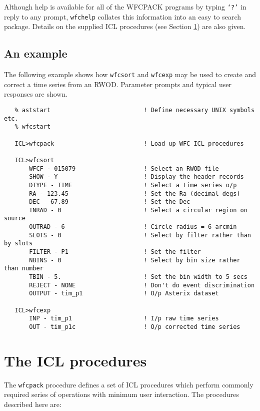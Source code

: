 Although help is available for all of the WFCPACK programs by typing
{\tt `?'} in reply to any prompt, {\tt wfchelp} collates this information
into an easy to search package. Details on the supplied ICL procedures
(see Section \ref{sec:procedures}) are also given.

\subsection{An example}
\label{sec:programs:example}

The following example shows how {\tt wfcsort} and {\tt wfcexp} may be
used to create and correct a time series from an RWOD. Parameter
prompts and typical user responses are shown.

\begin{verbatim}
   % aststart                          ! Define necessary UNIX symbols etc.
   % wfcstart

   ICL>wfcpack                         ! Load up WFC ICL procedures

   ICL>wfcsort
       WFCF - 015079                   ! Select an RWOD file
       SHOW - Y                        ! Display the header records
       DTYPE - TIME                    ! Select a time series o/p
       RA - 123.45                     ! Set the Ra (decimal degs)
       DEC - 67.89                     ! Set the Dec
       INRAD - 0                       ! Select a circular region on source
       OUTRAD - 6                      ! Circle radius = 6 arcmin
       SLOTS - 0                       ! Select by filter rather than by slots
       FILTER - P1                     ! Set the filter
       NBINS - 0                       ! Select by bin size rather than number
       TBIN - 5.                       ! Set the bin width to 5 secs
       REJECT - NONE                   ! Don't do event discrimination
       OUTPUT - tim_p1                 ! O/p Asterix dataset

   ICL>wfcexp
       INP - tim_p1                    ! I/p raw time series
       OUT - tim_p1c                   ! O/p corrected time series

\end{verbatim}

\section{The ICL procedures}
\label{sec:procedures}

The {\tt wfcpack} procedure defines a set of ICL procedures which perform
commonly required series of operations with minimum user interaction.
The procedures described here are:

